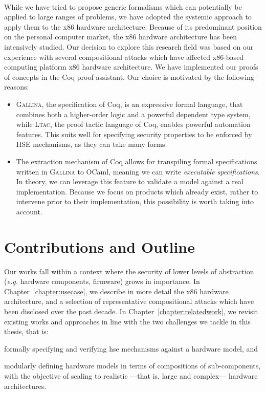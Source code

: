 \paragraph{}
%
While we have tried to propose generic formalisms which can potentially be
applied to large ranges of problems, we have adopted the systemic approach to
apply them to the x86 hardware architecture.
%
Because of its predominant position on the personal computer market, the x86
hardware architecture has been intensively studied.
%
Our decision to explore this research field was based on our experience with
several compositional attacks which have affected x86-based computing platform
x86 hardware architecture.
%
We have implemented our proofs of concepts in the Coq proof assistant.
%
Our choice is motivated by the following reasons:
%
\begin{itemize}
\item {\scshape Gallina}, the specification of Coq, is an expressive formal
  language, that combines both a higher-order logic and a powerful dependent
  type system, while {\scshape Ltac}, the proof tactic language of Coq, enables
  powerful automation features.
  This suits well for specifying security properties to be enforced by HSE
  mechanisms, as they can take many forms.
\item The extraction mechanism of Coq allows for transpiling formal
  specifications written in {\scshape Gallina} to OCaml, meaning we can write
  \emph{executable specifications}.
  In theory, we can leverage this feature to validate a model against a real
  implementation.
  Because we focus on products which already exist, rather to intervene prior to
  their implementation, this possibility is worth taking into account.
\end{itemize}

\section{Contributions and Outline}

Our works fall within a context where the security of lower levels of
abstraction (\emph{e.g.} hardware components, firmware) grows in importance.
%
In Chapter~\ref{chapter:usecase}, we describe in more detail the x86 hardware
architecture, and a selection of representative compositional attacks which have
been disclosed over the past decade.
%
In Chapter~\ref{chapter:relatedwork}, we revisit existing works and approaches
in line with the two challenges we tackle in this thesis, that is:
%
\begin{inparaenum}[(1)]
\item formally specifying and verifying \ac{hse} mechanisms against a hardware
  model, and
%
\item modularly defining hardware models in terms of compositions of
  sub-components, with the objective of scaling to realistic ---that is, large
  and complex--- hardware architectures.
\end{inparaenum}


